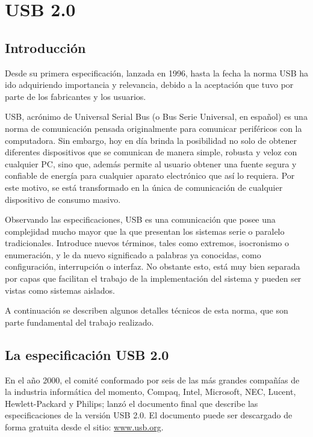 \chapter{USB 2.0}

  \section{Introducción}
  Desde su primera especificación, lanzada en 1996, hasta la fecha la norma USB
  ha ido adquiriendo importancia y relevancia, debido a la aceptación que tuvo
  por parte de los fabricantes y los usuarios.

  USB, acrónimo de Universal Serial Bus (o Bus Serie Universal, en español) es
  una norma de comunicación pensada originalmente para comunicar periféricos con
  la computadora. Sin embargo, hoy en día brinda la posibilidad no solo de
  obtener diferentes dispositivos que se comunican de manera simple, robusta y
  veloz con cualquier PC, sino que, además permite al usuario obtener una fuente
  segura y confiable de energía para cualquier aparato electrónico que así lo
  requiera. Por este motivo, se está transformado en la única de comunicación de
  cualquier dispositivo de consumo masivo.

  Observando las especificaciones, USB es una comunicación que posee una
  complejidad mucho mayor que la que presentan los sistemas serie o paralelo
  tradicionales. Introduce nuevos términos, tales como extremos,
  isocronismo o enumeración, y le da nuevo significado a palabras ya conocidas,
  como configuración, interrupción o interfaz. No obstante esto, está muy bien
  separada por capas que facilitan el trabajo de la implementación del sistema
  y pueden ser vistas como sistemas aislados.

  A continuación se describen algunos detalles técnicos de esta norma, que son
  parte fundamental del trabajo realizado.

  \section{La especificación USB 2.0}
  En el año 2000, el comité conformado por seis de las más grandes compañías de
  la industria informática del momento, Compaq, Intel, Microsoft, NEC, Lucent,
  Hewlett-Packard y Philips; lanzó el documento final que describe las
  especificaciones de la versión USB 2.0. El documento puede ser descargado de
  forma gratuita desde el sitio: \href{http://www.usb.org}{www.usb.org}.

